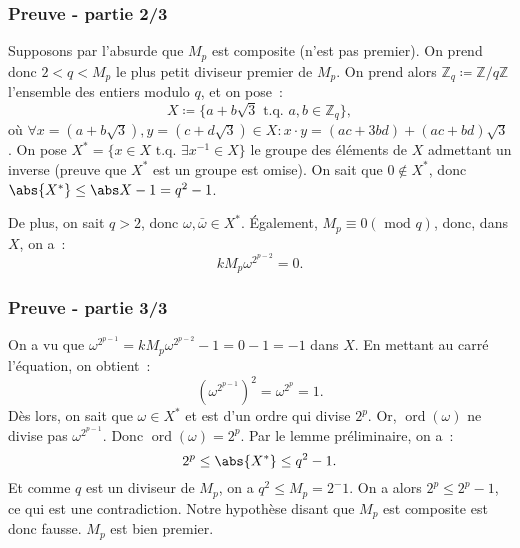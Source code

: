 \documentclass[10pt, mathserif]{beamer}
\DeclareMathOperator{\ord}{ord}
\newcommand{\tq}{\text{ t.q. }}
\newcommand{\Z}{\mathbb Z}
\renewcommand{\mod}{\mbox{ mod }}
\theoremstyle{definition}
\theoremstyle{remark}
\begin{document}
	\begin{frame}
		\frametitle{Preuve - partie 2/3}
		Supposons par l'absurde que $M_p$ est composite (n'est pas premier). On prend donc $2 < q < M_p$ le plus petit diviseur premier de $M_p$. On prend
		alors $\Z_q \coloneqq \Z/q\Z$ l'ensemble des entiers modulo $q$, et on pose~:
		\[X \coloneqq \{a + b\sqrt 3 \tq a, b \in \Z_q\},\]
		où $\forall x = (a+b\sqrt 3), y = (c+d\sqrt 3) \in X : x \cdot y = (ac+3bd) + (ac+bd)\sqrt 3$. On pose $X^* = \{x \in X \tq \exists x^{-1} \in X\}$
		le groupe des éléments de $X$ admettant un inverse (preuve que $X^*$ est un groupe est omise). On sait que $0 \not \in X^*$, donc $\abs {X^*} \leq \abs X -1=q^2 - 1$.

		De plus, on sait $q > 2$, donc $\omega, \bar \omega \in X^*$. Également, $M_p \equiv 0 (\mod q)$, donc, dans $X$, on a~:
		\[kM_p\omega^{2^{p-2}} = 0.\]
	\end{frame}
	
	\begin{frame}
		\frametitle{Preuve - partie 3/3}
		On a vu que $\omega^{2^{p-1}} = kM_p\omega^{2^{p-2}} - 1 = 0 - 1 = -1$ dans $X$. En mettant au carré l'équation, on obtient~:
		\[\left(\omega^{2^{p-1}}\right)^2 = \omega^{2^p} = 1.\]
		Dès lors, on sait que $\omega \in X^*$ et est d'un ordre qui divise $2^p$. Or, $\ord(\omega)$ ne divise pas $\omega^{2^{p-1}}$. Donc $\ord(\omega) = 2^p$.
		Par le lemme préliminaire, on a~:
		\[2^p \leq \abs {X^*} \leq q^2 - 1.\]
		Et comme $q$ est un diviseur de $M_p$, on a $q^2 \leq M_p = 2^-1$. On a alors $2^p \leq 2^p - 1$, ce qui est une contradiction. Notre hypothèse disant que
		$M_p$ est composite est donc fausse. $M_p$ est bien premier.
	\end{frame}
\end{document}
